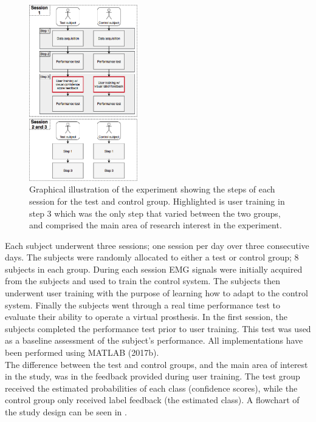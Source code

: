 

\begin{figure}[H]                                         
	\includegraphics[width=0.42\textwidth]{figures/Paper/Study_design}  
	\caption{Graphical illustration of the experiment showing the steps of each session for the test and control group. Highlighted is user training in step 3 which was the only step that varied between the two groups, and comprised the main area of research interest in the experiment.}
	\label{fig:P:std} 
\end{figure}
\vspace{-0.7cm}
Each subject underwent three sessions; one session per day over three consecutive days. The subjects were randomly allocated to either a test or control group; 8 subjects in each group. During each session EMG signals were initially acquired from the subjects and used to train the control system. The subjects then underwent user training with the purpose of learning how to adapt to the control system. Finally the subjects went through a real time performance test to evaluate their ability to operate a virtual prosthesis. In the first session, the subjects completed the performance test prior to user training. This test was used as a baseline assessment of the subject's performance. All implementations have been performed using MATLAB (2017b). \\
The difference between the test and control groups, and the main area of interest in the study, was in the feedback provided during user training. The test group received the estimated probabilities of each class (confidence scores), while the control group only received label feedback (the estimated class). A flowchart of the study design can be seen in .


